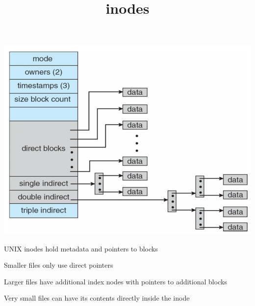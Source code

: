 

\title{inodes}



  \begin{frame}
    \titlepage
  \end{frame}

  \begin{slide}
    

    \includegraphics[height=0.8\textheight]{hinode.png}

  \end{slide}

  \begin{slide}
    

    UNIX inodes hold metadata and pointers to blocks
    \medskip

    Smaller files only use direct pointers
    \medskip

    Larger files have additional index nodes with pointers to additional blocks
    \medskip

    Very small files can have its contents directly inside the inode

  \end{slide}

